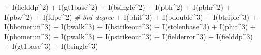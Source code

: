\documentclass[
]{article}
\newenvironment{Shaded}{\begin{snugshade}}{\end{snugshade}}
\newcommand{\CommentTok}[1]{\textcolor[rgb]{0.56,0.35,0.01}{\textit{#1}}}
\newcommand{\DecValTok}[1]{\textcolor[rgb]{0.00,0.00,0.81}{#1}}
\newcommand{\FunctionTok}[1]{\textcolor[rgb]{0.00,0.00,0.00}{#1}}
\newcommand{\NormalTok}[1]{#1}
\newcommand{\SpecialCharTok}[1]{\textcolor[rgb]{0.00,0.00,0.00}{#1}}
\begin{document}
\begin{Shaded}
\begin{Highlighting}[]
               \SpecialCharTok{+} \FunctionTok{I}\NormalTok{(fielddp}\SpecialCharTok{\^{}}\DecValTok{2}\NormalTok{) }
               \SpecialCharTok{+} \FunctionTok{I}\NormalTok{(gt1base}\SpecialCharTok{\^{}}\DecValTok{2}\NormalTok{) }
               \SpecialCharTok{+} \FunctionTok{I}\NormalTok{(bsingle}\SpecialCharTok{\^{}}\DecValTok{2}\NormalTok{) }
               \SpecialCharTok{+} \FunctionTok{I}\NormalTok{(pbh}\SpecialCharTok{\^{}}\DecValTok{2}\NormalTok{) }
               \SpecialCharTok{+} \FunctionTok{I}\NormalTok{(pbhr}\SpecialCharTok{\^{}}\DecValTok{2}\NormalTok{) }
               \SpecialCharTok{+} \FunctionTok{I}\NormalTok{(pbw}\SpecialCharTok{\^{}}\DecValTok{2}\NormalTok{) }
               \SpecialCharTok{+} \FunctionTok{I}\NormalTok{(fdpe}\SpecialCharTok{\^{}}\DecValTok{2}\NormalTok{) }
               \CommentTok{\# 3rd degree}
               \SpecialCharTok{+} \FunctionTok{I}\NormalTok{(bhit}\SpecialCharTok{\^{}}\DecValTok{3}\NormalTok{)}
               \SpecialCharTok{+} \FunctionTok{I}\NormalTok{(bdouble}\SpecialCharTok{\^{}}\DecValTok{3}\NormalTok{) }
               \SpecialCharTok{+} \FunctionTok{I}\NormalTok{(btriple}\SpecialCharTok{\^{}}\DecValTok{3}\NormalTok{) }
               \SpecialCharTok{+} \FunctionTok{I}\NormalTok{(bhomerun}\SpecialCharTok{\^{}}\DecValTok{3}\NormalTok{) }
               \SpecialCharTok{+} \FunctionTok{I}\NormalTok{(bwalk}\SpecialCharTok{\^{}}\DecValTok{3}\NormalTok{) }
               \SpecialCharTok{+} \FunctionTok{I}\NormalTok{(bstrikeout}\SpecialCharTok{\^{}}\DecValTok{3}\NormalTok{) }
               \SpecialCharTok{+} \FunctionTok{I}\NormalTok{(stolenbase}\SpecialCharTok{\^{}}\DecValTok{3}\NormalTok{) }
               \SpecialCharTok{+} \FunctionTok{I}\NormalTok{(phit}\SpecialCharTok{\^{}}\DecValTok{3}\NormalTok{) }
               \SpecialCharTok{+} \FunctionTok{I}\NormalTok{(phomerun}\SpecialCharTok{\^{}}\DecValTok{3}\NormalTok{) }
               \SpecialCharTok{+} \FunctionTok{I}\NormalTok{(pwalk}\SpecialCharTok{\^{}}\DecValTok{3}\NormalTok{) }
               \SpecialCharTok{+} \FunctionTok{I}\NormalTok{(pstrikeout}\SpecialCharTok{\^{}}\DecValTok{3}\NormalTok{) }
               \SpecialCharTok{+} \FunctionTok{I}\NormalTok{(fielderror}\SpecialCharTok{\^{}}\DecValTok{3}\NormalTok{) }
               \SpecialCharTok{+} \FunctionTok{I}\NormalTok{(fielddp}\SpecialCharTok{\^{}}\DecValTok{3}\NormalTok{) }
               \SpecialCharTok{+} \FunctionTok{I}\NormalTok{(gt1base}\SpecialCharTok{\^{}}\DecValTok{3}\NormalTok{) }
               \SpecialCharTok{+} \FunctionTok{I}\NormalTok{(bsingle}\SpecialCharTok{\^{}}\DecValTok{3}\NormalTok{) }

\end{Highlighting}
\end{Shaded}
\end{document}
